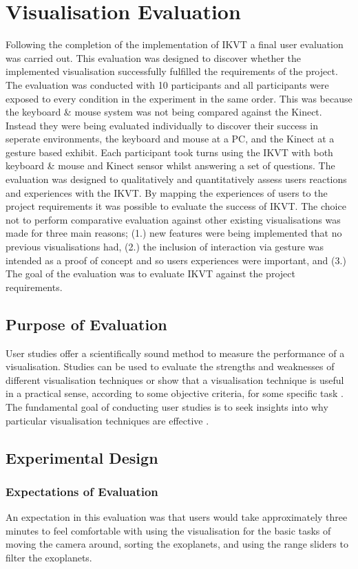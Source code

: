 \chapter{Visualisation Evaluation}\label{C:eval}
Following the completion of the implementation of IKVT a final
user evaluation was carried out. This evaluation was
 designed to discover whether the implemented visualisation
successfully fulfilled the requirements of the project. The evaluation
was conducted with 10
participants and all participants were exposed to every condition
in the experiment in the same order. This was because the keyboard \& mouse system was not being compared against the Kinect. Instead they were being evaluated individually to discover their success in seperate environments, the keyboard and mouse at a PC, and the Kinect at a gesture based exhibit. Each participant took turns using the IKVT with both keyboard
\&
mouse and Kinect sensor whilst answering a set of questions.
The evaluation was designed to qualitatively and
quantitatively assess users
reactions and experiences with the IKVT. By mapping the experiences of users to
the
project requirements it was possible to evaluate the success of IKVT. The choice not to perform comparative evaluation against other existing visualisations was made for three main
reasons; (1.) new features were being implemented that no previous
visualisations had, (2.) the inclusion of interaction via gesture was intended
as a proof of concept and so users experiences were important, and (3.) The goal
of the evaluation was to evaluate IKVT against the project requirements.

\section{Purpose of Evaluation}
User studies offer a 
scientifically sound method to measure the performance of a visualisation.
Studies can 
be used to evaluate the strengths and weaknesses of 
different visualisation techniques or show that a visualisation technique is 
useful in a practical sense, according to some objective 
criteria, for some specific task \cite{kosara2003thoughts}. 
The fundamental goal of conducting user studies is to 
seek insights into why particular visualisation techniques are effective
\cite{kosara2003thoughts}.


\section{Experimental Design}
\subsection{Expectations of Evaluation}
An expectation in this evaluation was that users would take approximately three
minutes to feel comfortable with using the visualisation for the basic tasks of
moving the camera around, sorting the exoplanets, and using the range sliders to
filter the exoplanets. 

